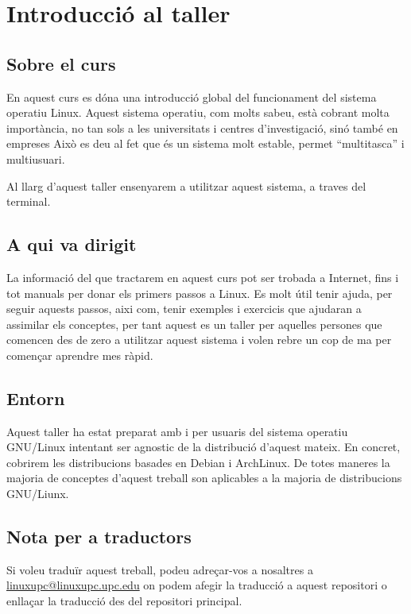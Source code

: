 \section{Introducció al taller}

\subsection{Sobre el curs}

\par
En aquest curs es dóna una introducció global del funcionament del sistema operatiu Linux.
Aquest sistema operatiu, com molts sabeu, està cobrant molta importància, no tan sols a les universitats i centres d'investigació, sinó també en empreses
Això es deu al fet que és un sistema molt estable, permet ``multitasca'' i multiusuari.
\par
Al llarg d'aquest taller ensenyarem a utilitzar aquest sistema, a traves del terminal.

\subsection{A qui va dirigit}

\par
La informació del que tractarem en aquest curs pot ser trobada a Internet, fins i tot manuals per donar els primers passos a Linux.
Es molt útil tenir ajuda, per seguir aquests passos, aixi com, tenir exemples i exercicis que ajudaran a assimilar els conceptes, per tant aquest es un taller per aquelles persones que comencen des de zero a utilitzar aquest sistema i volen rebre un cop de ma per començar aprendre mes ràpid.

\subsection{Entorn}

\par
Aquest taller ha estat preparat amb i per usuaris del sistema operatiu GNU/Linux intentant
ser agnostic de la distribució d'aquest mateix. En concret, cobrirem les distribucions basades
en Debian i ArchLinux. %
De totes maneres la majoria de conceptes d'aquest treball son aplicables a la majoria de
distribucions GNU/Liunx.

\subsection{Nota per a traductors}

\par
Si voleu traduïr aquest treball, podeu adreçar-vos a nosaltres a \href{mailto:linuxupc@linuxupc.upc.edu}{linuxupc@linuxupc.upc.edu}
on podem afegir la traducció a aquest repositori o enllaçar la traducció des del repositori principal.
